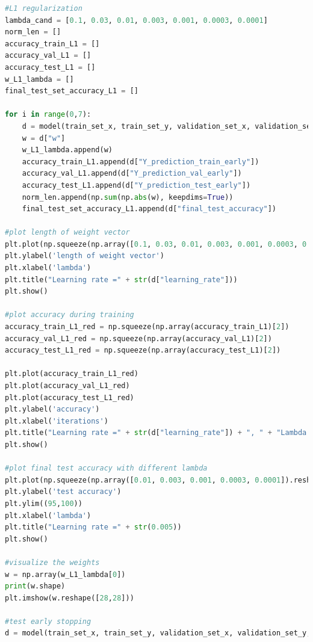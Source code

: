 \documentclass{article} %
\begin{document}
{\begin{lstlisting}[language=Python]
#L1 regularization
lambda_cand = [0.1, 0.03, 0.01, 0.003, 0.001, 0.0003, 0.0001]
norm_len = []
accuracy_train_L1 = []
accuracy_val_L1 = []
accuracy_test_L1 = []
w_L1_lambda = []
final_test_set_accuracy_L1 = []

for i in range(0,7):
    d = model(train_set_x, train_set_y, validation_set_x, validation_set_y, test_set_x, test_set_y, lambda_reg = lambda_cand[i], reg_type = 1, num_iterations = 5000, learning_rate = 0.005, print_cost = True, early_stopping = True)
    w = d["w"]
    w_L1_lambda.append(w)
    accuracy_train_L1.append(d["Y_prediction_train_early"])
    accuracy_val_L1.append(d["Y_prediction_val_early"])
    accuracy_test_L1.append(d["Y_prediction_test_early"])
    norm_len.append(np.sum(np.abs(w), keepdims=True))
    final_test_set_accuracy_L1.append(d["final_test_accuracy"])

#plot length of weight vector
plt.plot(np.squeeze(np.array([0.1, 0.03, 0.01, 0.003, 0.001, 0.0003, 0.0001]).reshape(1,7)),np.squeeze(np.array(norm_len[4:11]).reshape(1,7)))
plt.ylabel('length of weight vector')
plt.xlabel('lambda')
plt.title("Learning rate =" + str(d["learning_rate"]))
plt.show()

#plot accuracy during training
accuracy_train_L1_red = np.squeeze(np.array(accuracy_train_L1)[2])
accuracy_val_L1_red = np.squeeze(np.array(accuracy_val_L1)[2])
accuracy_test_L1_red = np.squeeze(np.array(accuracy_test_L1)[2])

plt.plot(accuracy_train_L1_red)
plt.plot(accuracy_val_L1_red)
plt.plot(accuracy_test_L1_red)
plt.ylabel('accuracy')
plt.xlabel('iterations')
plt.title("Learning rate =" + str(d["learning_rate"]) + ", " + "Lambda =" + str(1))
plt.show()

#plot final test accuracy with different lambda
plt.plot(np.squeeze(np.array([0.01, 0.003, 0.001, 0.0003, 0.0001]).reshape(1,5)),np.squeeze(np.array(final_test_set_accuracy_L1[6:11]).reshape(1,5)), np.squeeze(np.array([0.01, 0.003, 0.001, 0.0003, 0.0001]).reshape(1,5)),np.squeeze(np.array(final_test_set_accuracy_L1[6:11]).reshape(1,5)), 'or')
plt.ylabel('test accuracy')
plt.ylim((95,100))
plt.xlabel('lambda')
plt.title("Learning rate =" + str(0.005))
plt.show()

#visualize the weights
w = np.array(w_L1_lambda[0])
print(w.shape)
plt.imshow(w.reshape([28,28]))

#test early stopping
d = model(train_set_x, train_set_y, validation_set_x, validation_set_y, test_set_x, test_set_y, lambda_reg = 0, reg_type = 2, num_iterations = 5000, learning_rate = 0.005, print_cost = True, early_stopping = True)




\end{lstlisting}}
\end{document}
